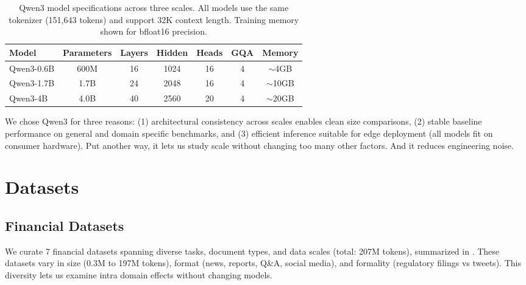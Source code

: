 \begin{table}[h]
\centering
\caption[Qwen3 Model Specifications]{Qwen3 model specifications across three scales. All models use the same tokenizer (151,643 tokens) and support 32K context length. Training memory shown for bfloat16 precision.}
\label{tab:model_specs}
\begin{tabular}{lcccccc}
\toprule
\textbf{Model} & \textbf{Parameters} & \textbf{Layers} & \textbf{Hidden} & \textbf{Heads} & \textbf{GQA} & \textbf{Memory} \\
\midrule
Qwen3-0.6B & 600M & 16 & 1024 & 16 & 4 & $\sim$4GB \\
Qwen3-1.7B & 1.7B & 24 & 2048 & 16 & 4 & $\sim$10GB \\
Qwen3-4B & 4.0B & 40 & 2560 & 20 & 4 & $\sim$20GB \\
\bottomrule
\end{tabular}
\end{table}

We chose Qwen3 for three reasons: (1) architectural consistency across scales enables clean size comparisons, (2) stable baseline performance on general and domain specific benchmarks, and (3) efficient inference suitable for edge deployment (all models fit on consumer hardware). Put another way, it lets us study scale without changing too many other factors. And it reduces engineering noise.

\section{Datasets}

\subsection{Financial Datasets}

We curate 7 financial datasets spanning diverse tasks, document types, and data scales (total: 207M tokens), summarized in . These datasets vary in size (0.3M to 197M tokens), format (news, reports, Q\&A, social media), and formality (regulatory filings vs tweets). This diversity lets us examine intra domain effects without changing models.

